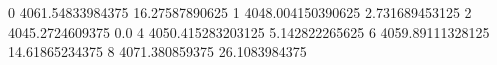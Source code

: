0 4061.54833984375 16.27587890625
1 4048.004150390625 2.731689453125
2 4045.2724609375 0.0
4 4050.415283203125 5.142822265625
6 4059.89111328125 14.61865234375
8 4071.380859375 26.1083984375
